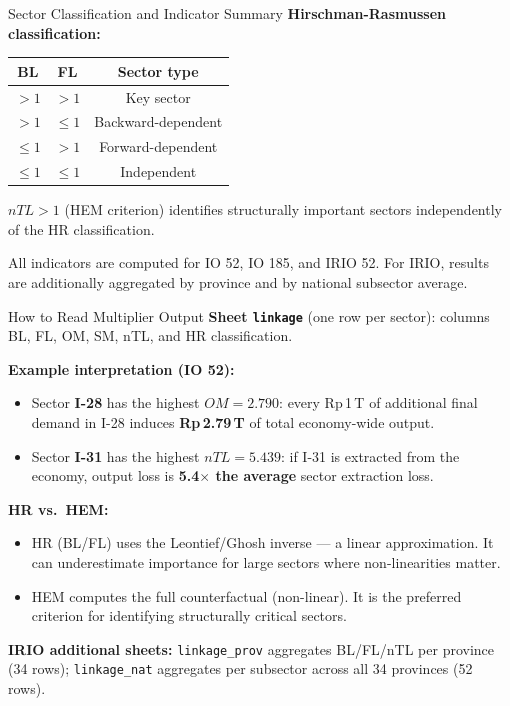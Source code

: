 \documentclass[aspectratio=169]{beamer}
\begin{document}
\begin{frame}{Sector Classification and Indicator Summary}
\textbf{Hirschman-Rasmussen classification:}

\medskip
\begin{center}
\begin{tabular}{ccc}
\toprule
\textbf{BL} & \textbf{FL} & \textbf{Sector type} \\
\midrule
$>1$ & $>1$ & Key sector \\
$>1$ & $\leq 1$ & Backward-dependent \\
$\leq 1$ & $>1$ & Forward-dependent \\
$\leq 1$ & $\leq 1$ & Independent \\
\bottomrule
\end{tabular}
\end{center}

\medskip
$nTL > 1$ (HEM criterion) identifies structurally important sectors independently of the HR classification.

\medskip
All indicators are computed for IO 52, IO 185, and IRIO 52. For IRIO, results are additionally aggregated by province and by national subsector average.
\end{frame}

\begin{frame}{How to Read Multiplier Output}
\textbf{Sheet \texttt{linkage}} (one row per sector): columns BL, FL, OM, SM, nTL, and HR classification.

\medskip
\textbf{Example interpretation (IO 52):}
\begin{itemize}
  \item Sector \textbf{I-28} has the highest $OM = 2.790$: every Rp\,1\,T of additional final demand in I-28 induces \textbf{Rp\,2.79\,T} of total economy-wide output.
  \item Sector \textbf{I-31} has the highest $nTL = 5.439$: if I-31 is extracted from the economy, output loss is \textbf{5.4$\times$ the average} sector extraction loss.
\end{itemize}

\medskip
\textbf{HR vs.\ HEM:}
\begin{itemize}
  \item HR (BL/FL) uses the Leontief/Ghosh inverse --- a linear approximation. It can underestimate importance for large sectors where non-linearities matter.
  \item HEM computes the full counterfactual (non-linear). It is the preferred criterion for identifying structurally critical sectors.
\end{itemize}

\medskip
\textbf{IRIO additional sheets:} \texttt{linkage\_prov} aggregates BL/FL/nTL per province (34 rows); \texttt{linkage\_nat} aggregates per subsector across all 34 provinces (52 rows).
\end{frame}
\end{document}
